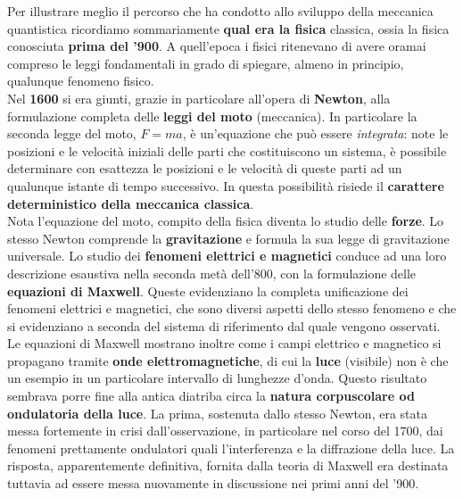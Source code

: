\documentclass[a4paper,12pt,oneside]{book}
\begin{document}
Per illustrare meglio il percorso che ha condotto allo sviluppo della meccanica quantistica ricordiamo sommariamente \textbf{qual era la fisica} classica, ossia la fisica conosciuta \textbf{prima del '900}.  A quell'epoca i fisici ritenevano di avere oramai compreso le leggi fondamentali in grado di spiegare, almeno in principio, qualunque fenomeno fisico.\\
Nel \textbf{1600} si era giunti, grazie in particolare all'opera di \textbf{Newton}, alla formulazione completa delle \textbf{leggi del moto} (meccanica). In particolare la seconda legge del moto, $F=ma$, è un'equazione che può essere \textit{integrata}: note le posizioni e le velocità iniziali delle parti che costituiscono un sistema, è possibile determinare con esattezza le posizioni e le velocità di queste parti ad un qualunque istante di tempo successivo. In questa possibilità risiede il \textbf{carattere deterministico della meccanica classica}.\\
Nota l'equazione del moto, compito della fisica diventa lo studio delle \textbf{forze}.
Lo stesso Newton comprende la \textbf{gravitazione} e formula la sua legge di gravitazione universale.
Lo studio dei \textbf{fenomeni elettrici e magnetici} conduce ad una loro descrizione esaustiva nella seconda metà dell'800, con la formulazione delle \textbf{equazioni di Maxwell}. Queste evidenziano la completa unificazione dei fenomeni elettrici e magnetici, che sono diversi aspetti dello stesso fenomeno e che si evidenziano a seconda del sistema di riferimento dal quale vengono osservati.\\
Le equazioni di Maxwell mostrano inoltre come i campi elettrico e magnetico si propagano tramite \textbf{onde elettromagnetiche}, di cui la \textbf{luce} (visibile) non è che un esempio in un particolare intervallo di lunghezze d'onda. Questo risultato sembrava porre fine alla antica diatriba circa la \textbf{natura corpuscolare od ondulatoria della luce}. La prima, sostenuta dallo stesso Newton, era stata messa fortemente in crisi dall'osservazione, in particolare nel corso del 1700, dai fenomeni prettamente ondulatori quali l'interferenza e la diffrazione della luce. La risposta, apparentemente definitiva, fornita dalla teoria di Maxwell era destinata tuttavia ad essere messa nuovamente in discussione nei primi anni del '900.
\end{document}

